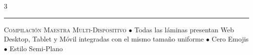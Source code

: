 \documentclass[11pt]{article}
\begin{document}
\begin{multicols}{3}
\end{multicols}

\vspace{6bp}
\noindent\textcolor{border}{\rule{\textwidth}{0.8bp}}
\vspace{2bp}
\begin{center}
    {\footnotesize\color{textmuted}\textsc{Compilación Maestra Multi-Dispositivo} \quad $\bullet$ \quad Todas las láminas presentan Web Desktop, Tablet y Móvil integradas con el mismo tamaño uniforme \quad $\bullet$ \quad Cero Emojis $\bullet$ Estilo Semi-Plano}
\end{center}
\end{document}
